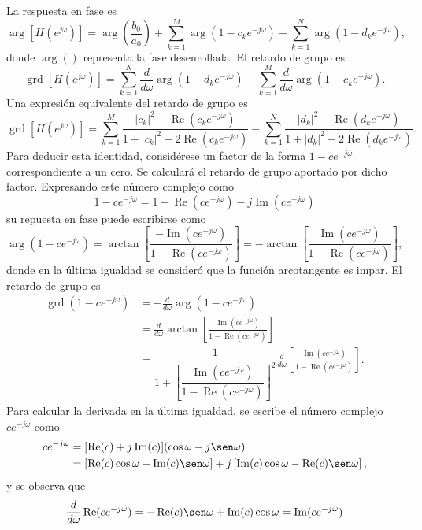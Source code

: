 \documentclass[a4paper]{report}
\renewcommand{\Re}{\operatorname{Re}}
\renewcommand{\Im}{\operatorname{Im}}
\DeclareMathOperator{\grd}{grd}
\begin{document}
La respuesta en fase es
\begin{equation}\label{eq:transform_analysis_rational_function_phase}
 \arg\left[H(e^{j\omega})\right]=\arg\left(\frac{b_0}{a_0}\right)+\sum_{k=1}^M\arg(1-c_ke^{-j\omega})-\sum_{k=1}^N\arg(1-d_ke^{-j\omega}), 
\end{equation}
donde \(\arg()\) representa la fase desenrollada. El retardo de grupo es
\[
 \grd\left[H(e^{j\omega})\right]=\sum_{k=1}^N\frac{d}{d\omega}\arg(1-d_ke^{-j\omega})-\sum_{k=1}^M\frac{d}{d\omega}\arg(1-c_ke^{-j\omega}).
\]
Una expresión equivalente del retardo de grupo es
\begin{equation}\label{eq:transform_analysis_rational_function_grd}
 \grd\left[H(e^{j\omega})\right]=\sum_{k=1}^M\frac{|c_k|^2-\Re(c_ke^{-j\omega})}{1+|c_k|^2-2\Re(c_ke^{-j\omega})}-\sum_{k=1}^N\frac{|d_k|^2-\Re(d_ke^{-j\omega})}{1+|d_k|^2-2\Re(d_ke^{-j\omega})}. 
\end{equation}
Para deducir esta identidad, considérese un factor de la forma \(1-ce^{-j\omega}\) correspondiente a un cero. Se calculará el retardo de grupo aportado por dicho factor. Expresando este número complejo como
\[
 1-ce^{-j\omega} = 1-\Re(ce^{-j\omega})-j\Im(ce^{-j\omega})
\]
su repuesta en fase puede escribirse como
\[
 \arg(1-ce^{-j\omega})=\arctan\left[\frac{-\Im(ce^{-j\omega})}{1-\Re(ce^{-j\omega})}\right]
   =-\arctan\left[\frac{\Im(ce^{-j\omega})}{1-\Re(ce^{-j\omega})}\right],
\]
donde en la última igualdad se consideró que la función arcotangente es impar. El retardo de grupo es
\begin{align}
 \grd(1-ce^{-j\omega})&=-\frac{d}{d\omega}\arg(1-ce^{-j\omega})\nonumber\\
  &=\frac{d}{d\omega}\arctan\left[\frac{\Im(ce^{-j\omega})}{1-\Re(ce^{-j\omega})}\right]\nonumber\\
  &=\dfrac{1}{1+\left[\dfrac{\Im(ce^{-j\omega})}{1-\Re(ce^{-j\omega})}\right]^2}
    \frac{d}{d\omega}\left[\frac{\Im(ce^{-j\omega})}{1-\Re(ce^{-j\omega})}\right]\label{eq:transform_analysis_grd_deduction_tmp_1}.
\end{align}
Para calcular la derivada en la última igualdad, se escribe el número complejo \(ce^{-j\omega}\) como
\begin{align*}
 ce^{-j\omega}&=[\Re(c)+j\Im(c)](\cos\omega-j\sen\omega)\\
  &=[\Re(c)\cos\omega+\Im(c)\sen\omega]+j\left[\Im(c)\cos\omega-\Re(c)\sen\omega\right],
\end{align*}
y se observa que 
\begin{equation}\label{eq:transform_analysis_grd_deduction_tmp_2}
 \frac{d}{d\omega}\Re(ce^{-j\omega})=-\Re(c)\sen\omega+\Im(c)\cos\omega=\Im(ce^{-j\omega}) 
\end{equation}
\end{document}
